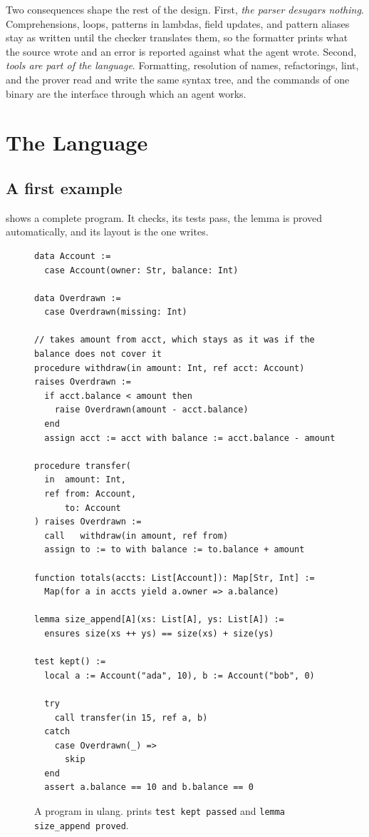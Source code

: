 \documentclass[11pt,a4paper]{article}
\newcommand{\code}[1]{\texttt{\detokenize{#1}}}
\begin{document}
\noindent
Two consequences shape the rest of the design. First, \emph{the parser desugars nothing}.
Comprehensions, \code{for} loops, patterns in lambdas, field updates, and pattern aliases
stay as written until the checker translates them, so the formatter prints what the source
wrote and an error is reported against what the agent wrote. Second, \emph{tools are part of
the language}. Formatting, resolution of names, refactorings, lint, and the prover read and
write the same syntax tree, and the commands of one binary are the interface through which an
agent works.

\section{The Language}\label{sec:language}

\subsection{A first example}

 shows a complete program. It checks, its tests pass, the lemma is proved
automatically, and its layout is the one \code{format} writes.

\begin{figure}[t]
\begin{lstlisting}
data Account :=
  case Account(owner: Str, balance: Int)

data Overdrawn :=
  case Overdrawn(missing: Int)

// takes amount from acct, which stays as it was if the balance does not cover it
procedure withdraw(in amount: Int, ref acct: Account) raises Overdrawn :=
  if acct.balance < amount then
    raise Overdrawn(amount - acct.balance)
  end
  assign acct := acct with balance := acct.balance - amount

procedure transfer(
  in  amount: Int,
  ref from: Account,
      to: Account
) raises Overdrawn :=
  call   withdraw(in amount, ref from)
  assign to := to with balance := to.balance + amount

function totals(accts: List[Account]): Map[Str, Int] :=
  Map(for a in accts yield a.owner => a.balance)

lemma size_append[A](xs: List[A], ys: List[A]) :=
  ensures size(xs ++ ys) == size(xs) + size(ys)

test kept() :=
  local a := Account("ada", 10), b := Account("bob", 0)

  try
    call transfer(in 15, ref a, b)
  catch
    case Overdrawn(_) =>
      skip
  end
  assert a.balance == 10 and b.balance == 0
\end{lstlisting}
\caption{A program in ulang. \code{ulang test} prints \texttt{test kept passed} and
\texttt{lemma size\_append proved}.}
\label{fig:bank}
\end{figure}
\end{document}
